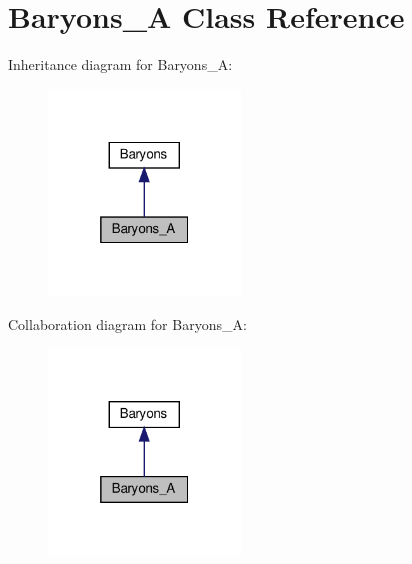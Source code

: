 \hypertarget{classBaryons__A}{}\section{Baryons\+\_\+A Class Reference}
\label{classBaryons__A}


Inheritance diagram for Baryons\+\_\+A\+:\nopagebreak
\begin{figure}[H]
\begin{center}
\leavevmode
\includegraphics[width=145pt]{classBaryons__A__inherit__graph}
\end{center}
\end{figure}


Collaboration diagram for Baryons\+\_\+A\+:\nopagebreak
\begin{figure}[H]
\begin{center}
\leavevmode
\includegraphics[width=145pt]{classBaryons__A__coll__graph}
\end{center}
\end{figure}
